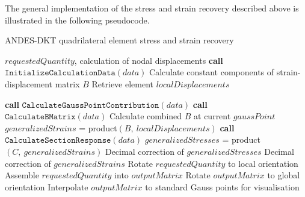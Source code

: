 The general implementation of the stress and strain recovery described above is illustrated in the following pseudocode.

\begin{algorithm}
	\onehalfspacing
	\caption{ANDES-DKT quadrilateral element stress and strain recovery}
	\label{ANDES-DKT quadrilateral element stress and strain recovery}
	\begin{algorithmic}[1]
		\Require $requestedQuantity$, calculation of nodal displacements
		\State \textbf{call} $\texttt{InitializeCalculationData}(data)$
		\State \hspace{\algorithmicindent}Calculate constant components of strain-displacement matrix $B$
		\State \hspace{\algorithmicindent}Retrieve element $localDisplacements$
		
		\State \textbf{call} $\texttt{CalculateGaussPointContribution}(data)$
		\State \hspace{\algorithmicindent}\textbf{call} $\texttt{CalculateBMatrix}(data)$
		\State \hspace{\algorithmicindent}\hspace{\algorithmicindent} Calculate combined $B$ at current $gaussPoint$
		\State $generalizedStrains$ = product$(B,\ localDisplacements)$
		\State \textbf{call} $\texttt{CalculateSectionResponse}(data)$
		\State $generalizedStresses$ = product $(C,\ generalizedStrains)$
		\State Decimal correction of $generalizedStresses$
		\EndIf
		\State Decimal correction of $generalizedStrains$ 
		\State Rotate $requestedQuantity$ to local orientation
		\EndIf
		\State Assemble $requestedQuantity$ into $outputMatrix$
		\State Rotate $outputMatrix$ to global orientation
		\EndIf
		\State Interpolate $outputMatrix$ to standard Gauss points for visualisation
		\EndWhile
	\end{algorithmic}
\end{algorithm}